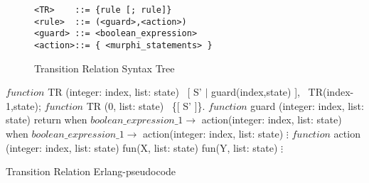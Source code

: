 \begin{figure}
\begin{verbatim} 
<TR>    ::= {rule [; rule]}
<rule>  ::= (<guard>,<action>)
<guard> ::= <boolean_expression>
<action>::= { <murphi_statements> }
\end{verbatim}
\caption{Transition Relation Syntax Tree}
\label{TRst}
\end{figure}

\begin{algorithm}
\begin{algorithmic}
\STATE $function$ TR (integer: index, list: state)
\STATE \ [ S' $|$ guard(index,state) ],
\STATE \ TR(index-1,state);
\newline
\STATE $function$ TR (0, list: state)
\STATE \ \{[ S' ]\}.
\newline
\STATE $function$ guard (integer: index, list: state)
\STATE return
\STATE when $boolean\_expression\_1 \rightarrow$ action(integer: index, list: state)
\STATE when $boolean\_expression\_1 \rightarrow$ action(integer: index, list: state)
\STATE $\vdots$
\ENDIF
\newline
\STATE $function$ action (integer: index, list: state)
\STATE fun(X, list: state)
\STATE fun(Y, list: state)
\STATE $\vdots$
\ENDIF


\caption{Transition Relation Erlang-pseudocode}
\label{TRerl}
\end{algorithmic}
\end{algorithm}




